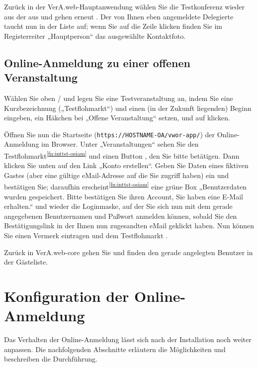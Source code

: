 Zurück in der VerA.web-Hauptanwendung wählen Sie die Testkonferenz
wieder aus der  aus und gehen
erneut . Der von Ihnen eben angemeldete
Delegierte taucht nun in der Liste auf; wenn Sie auf die Zeile klicken
finden Sie im Registerreiter „Hauptperson“ das ausgewählte Kontaktfoto.

\subsection{Online-Anmeldung zu einer offenen Veranstaltung}

Wählen Sie oben  /  und legen Sie eine Testveranstaltung an, indem Sie eine
Kurzbezeichnung („Testflohmarkt“) und einen (in der Zukunft liegenden)
Beginn eingeben, ein Häkchen bei „Offene Veranstaltung“ setzen, und
auf  klicken.

Öffnen Sie nun die Startseite (\texttt{https://HOSTNAME-OA/vwor-app/})
der Online-Anmeldung im Browser. Unter „Veranstaltungen“ sehen Sie
den Testflohmarkt\Hair\textsuperscript{\ref{fn:inttst-osiam}} und
einen Button , den Sie bitte
betätigen. Dann klicken Sie unten auf den Link „Konto erstellen“.
Geben Sie Daten eines fiktiven Gastes (aber eine gültige eMail-Adresse
auf die Sie zugriff haben) ein und bestätigen Sie; daraufhin
erscheint\Hair\textsuperscript{\ref{fn:inttst-osiam}} eine grüne Box
„Benutzerdaten wurden gespeichert. Bitte bestätigen Sie ihren Account,
Sie haben eine E-Mail erhalten.“ und wieder die Loginmaske, auf der
Sie sich nun mit dem gerade angegebenen Benutzernamen und Paßwort
anmelden können, sobald Sie den Bestätigungslink in der Ihnen nun
zugesandten eMail geklickt haben. Nun können Sie einen Vermerk eintragen
und dem Testflohmarkt .

Zurück in VerA.web-core gehen Sie 
und finden den gerade angelegten Benutzer in der Gästeliste.

\fi%

\ifoa
\section{Konfiguration der Online-Anmeldung}\label{sec:conf-oa}

Das Verhalten der Online-Anmeldung lässt sich nach der Installation
noch weiter anpassen. Die nachfolgenden Abschnitte erläutern die
Möglichkeiten und beschreiben die Durchführung.

